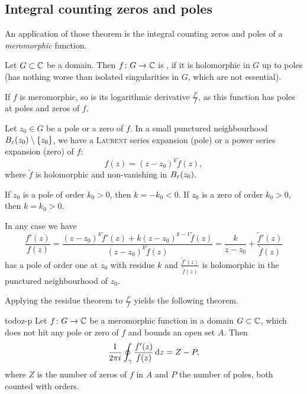 \documentclass[a4paper,english]{article}
\begin{document}
\subsection{Integral counting zeros and poles}

An application of those theorem is the integral counting zeros and poles of a \emph{meromorphic} function.

\begin{defn}
    Let $G \subset \operatorname{\mathbb{C}}$ be a domain.
    Then $f \colon G \to \operatorname{\mathbb{C}}$ is , if it is holomorphic in $G$ up to poles (has nothing worse than isolated singularities in $G$, which are not essential).
\end{defn}
\begin{remark}
    If $f$ is meromorphic, so is its logarithmic derivative $\frac{f'}{f}$, as this function has poles at poles and zeros of $f$.
    
    Let $z_0 \in G$ be a pole or a zero of $f$.
    In a small punctured neighbourhood $B_{\varepsilon}(z_0) \setminus \{ z_0 \}$, we have a \textsc{Laurent} series expansion (pole) or a power series expansion (zero) of $f$:
    \begin{equation*}
        f(z)
        = (z - z_0)^k \tilde{f}(z),
    \end{equation*}
    where $\tilde{f}$ is holomorphic and non-vanishing in $B_{\varepsilon}(z_0)$.
    
    If $z_0$ is a pole of order $k_0 > 0$, then $k = - k_0 < 0$.
    If $z_0$ is a zero of order $k_0 > 0$, then $k = k_0 > 0$.
    
    In any case we have
    \begin{equation*}
        \frac{f'(z)}{f(z)}
        = \frac{(z - z_0)^k \tilde{f}'(z) + k (z - z_0)^{k - 1} \tilde{f}(z)}{(z - z_0)^k \tilde{f}(z)}
        = \frac{k}{z - z_0} + \frac{\tilde{f}'(z)}{\tilde{f}(z)}
    \end{equation*}
    has a pole of order one at $z_0$ with residue $k$ and $\frac{\tilde{f}'(z)}{\tilde{f}(z)}$ is holomorphic in the punctured neighbourhood of $z_0$.
    
    Applying the residue theorem to $\frac{f'}{f}$ yields the following theorem.
\end{remark}

\begin{thm}{todo}{z-p}
    Let $f \colon G \to \operatorname{\mathbb{C}}$ be a meromorphic function in a domain $G \subset \operatorname{\mathbb{C}}$, which does not hit any pole or zero of $f$ and bounds an open set $A$.
    Then
    \begin{equation*}
        \frac{1}{2 \pi i} \oint_{\gamma} \frac{f'(z)}{f(z)} \mathop{}\!\mathrm{d}{z}
        = Z - P,
    \end{equation*}
    where $Z$ is the number of zeros of $f$ in $A$ and $P$ the number of poles, both counted with orders.
\end{thm}
\end{document}
